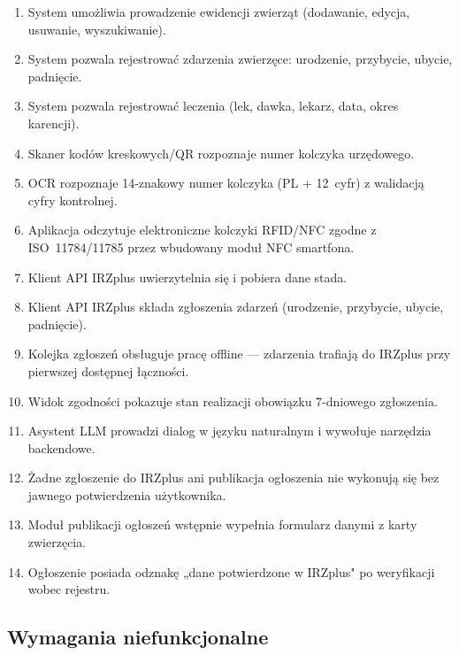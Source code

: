 \documentclass[11pt,a4paper]{article}
\begin{document}
\begin{enumerate}
  \item[\textbf{F1}] System umożliwia prowadzenie ewidencji zwierząt (dodawanie, edycja, usuwanie, wyszukiwanie).
  \item[\textbf{F2}] System pozwala rejestrować zdarzenia zwierzęce: urodzenie, przybycie, ubycie, padnięcie.
  \item[\textbf{F3}] System pozwala rejestrować leczenia (lek, dawka, lekarz, data, okres karencji).
  \item[\textbf{F4}] Skaner kodów kreskowych/QR rozpoznaje numer kolczyka urzędowego.
  \item[\textbf{F5}] OCR rozpoznaje 14-znakowy numer kolczyka (PL + 12~cyfr) z walidacją cyfry kontrolnej.
  \item[\textbf{F6}] Aplikacja odczytuje elektroniczne kolczyki RFID/NFC zgodne z ISO~11784/11785 przez wbudowany moduł NFC smartfona.
  \item[\textbf{F7}] Klient API IRZplus uwierzytelnia się i pobiera dane stada.
  \item[\textbf{F8}] Klient API IRZplus składa zgłoszenia zdarzeń (urodzenie, przybycie, ubycie, padnięcie).
  \item[\textbf{F9}] Kolejka zgłoszeń obsługuje pracę offline --- zdarzenia trafiają do IRZplus przy pierwszej dostępnej łączności.
  \item[\textbf{F10}] Widok zgodności pokazuje stan realizacji obowiązku 7-dniowego zgłoszenia.
  \item[\textbf{F11}] Asystent LLM prowadzi dialog w języku naturalnym i wywołuje narzędzia backendowe.
  \item[\textbf{F12}] Żadne zgłoszenie do IRZplus ani publikacja ogłoszenia nie wykonują się bez jawnego potwierdzenia użytkownika.
  \item[\textbf{F13}] Moduł publikacji ogłoszeń wstępnie wypełnia formularz danymi z karty zwierzęcia.
  \item[\textbf{F14}] Ogłoszenie posiada odznakę „dane potwierdzone w IRZplus" po weryfikacji wobec rejestru.
\end{enumerate}

\subsection{Wymagania niefunkcjonalne}
\end{document}
